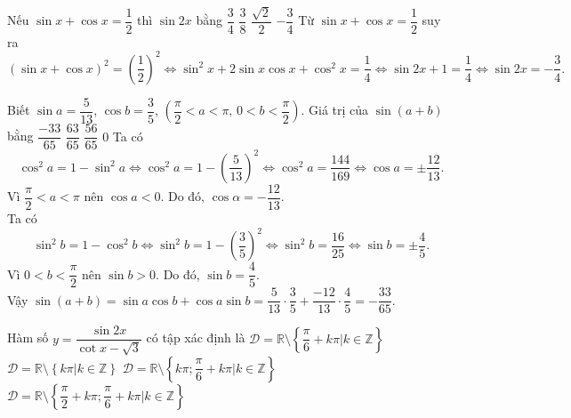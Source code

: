 \begin{ex}%
Nếu $\sin x+\cos x=\dfrac{1}{2}$ thì $\sin 2x$ bằng
\choice
{$\dfrac{3}{4}$}
{$\dfrac{3}{8}$}
{$\dfrac{\sqrt{2}}{2}$}
{\True $-\dfrac{3}{4}$}
\loigiai
{
Từ $\sin x+\cos x=\dfrac{1}{2}$ suy ra
\[(\sin x+\cos x)^2=\left(\dfrac{1}{2}\right)^2 \Leftrightarrow \sin^2 x+2\sin x\cos x+\cos^2 x=\dfrac{1}{4} \Leftrightarrow \sin 2x+1=\dfrac{1}{4} \Leftrightarrow \sin 2x=-\dfrac{3}{4}.\]
}
\end{ex}

\begin{ex}%
Biết $\sin a=\dfrac{5}{13}$, $\cos b=\dfrac{3}{5}$, $\left(\dfrac{\pi}{2}<a<\pi,\,0<b<\dfrac{\pi}{2}\right)$. Giá trị của $\sin(a+b)$ bằng
\choice
{\True $\dfrac{-33}{65}$}
{$\dfrac{63}{65}$}
{$\dfrac{56}{65}$}
{$0$}
\loigiai
{
Ta có
\[\cos^2 a = 1-\sin^2 a \Leftrightarrow \cos^2 a = 1-\left(\dfrac{5}{13}\right)^2 \Leftrightarrow \cos^2 a = \dfrac{144}{169} \Leftrightarrow \cos a = \pm\dfrac{12}{13}.\]
Vì $\dfrac{\pi}{2}<a<\pi$ nên $\cos a<0$. Do đó, $\cos \alpha=-\dfrac{12}{13}$.\\
Ta có
\[\sin^2 b = 1-\cos^2 b \Leftrightarrow \sin^2 b = 1-\left(\dfrac{3}{5}\right)^2 \Leftrightarrow \sin^2 b = \dfrac{16}{25} \Leftrightarrow \sin b = \pm\dfrac{4}{5}.\]
Vì $0<b<\dfrac{\pi}{2}$ nên $\sin b>0$. Do đó, $\sin b=\dfrac{4}{5}$.\\
Vậy $\sin (a+b)=\sin a\cos b+\cos a\sin b=\dfrac{5}{13}\cdot \dfrac{3}{5}+\dfrac{-12}{13}\cdot \dfrac{4}{5}=-\dfrac{33}{65}$.
}
\end{ex}

\begin{ex}%
Hàm số $y=\dfrac{\sin 2x}{\cot x-\sqrt{3}}$ có tập xác định là
\choice
{$\mathscr{D}=\mathbb{R} \setminus \left\{ \dfrac{\pi}{6}+k\pi |k \in \mathbb{Z} \right\}$}
{$\mathscr{D}=\mathbb{R} \setminus \left\{ k\pi |k \in \mathbb{Z} \right\}$}
{\True $\mathscr{D}=\mathbb{R} \setminus \left\{ k\pi;\dfrac{\pi}{6}+k\pi |k \in \mathbb{Z} \right\}$}
{$\mathscr{D}=\mathbb{R} \setminus \left\{ \dfrac{\pi}{2}+k\pi;\dfrac{\pi}{6}+k\pi |k \in \mathbb{Z} \right\}$}
\end{ex}

